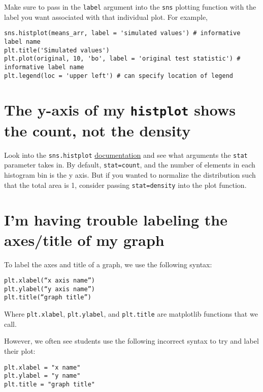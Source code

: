 \documentclass[
  letterpaper,
  DIV=11,
  numbers=noendperiod]{scrreprt}
\begin{document}
Make sure to pass in the \texttt{label} argument into the \texttt{sns}
plotting function with the label you want associated with that
individual plot. For example,

\begin{verbatim}
sns.histplot(means_arr, label = 'simulated values') # informative label name
plt.title('Simulated values') 
plt.plot(original, 10, 'bo', label = 'original test statistic') # informative label name
plt.legend(loc = 'upper left') # can specify location of legend
\end{verbatim}

\section{\texorpdfstring{The y-axis of my \texttt{histplot} shows the
count, not the
density}{The y-axis of my histplot shows the count, not the density}}\label{the-y-axis-of-my-histplot-shows-the-count-not-the-density}

Look into the \texttt{sns.histplot}
\href{https://seaborn.pydata.org/generated/seaborn.histplot.html}{documentation}
and see what arguments the \texttt{stat} parameter takes in. By default,
\texttt{stat=count}, and the number of elements in each histogram bin is
the y axis. But if you wanted to normalize the distribution such that
the total area is 1, consider passing \texttt{stat=density} into the
plot function.

\section{I'm having trouble labeling the axes/title of my
graph}\label{im-having-trouble-labeling-the-axestitle-of-my-graph}

To label the axes and title of a graph, we use the following syntax:

\begin{verbatim}
plt.xlabel(“x axis name”) 
plt.ylabel(“y axis name”) 
plt.title(“graph title”) 
\end{verbatim}

Where \texttt{plt.xlabel}, \texttt{plt.ylabel}, and \texttt{plt.title}
are matplotlib functions that we call.

However, we often see students use the following incorrect syntax to try
and label their plot:

\begin{verbatim}
plt.xlabel = "x name"
plt.ylabel = "y name"
plt.title = "graph title"
\end{verbatim}
\end{document}
